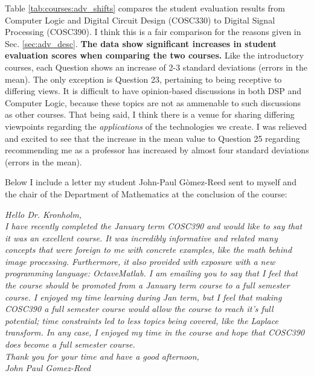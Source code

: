 \documentclass[../../main.tex]{subfiles}
\begin{document}
Table \ref{tab:courses:adv_shifts} compares the student evaluation results from Computer Logic and Digital Circuit Design (COSC330) to Digital Signal Processing (COSC390).  I think this is a fair comparison for the reasons given in Sec. \ref{sec:adv_desc}.  \textbf{The data show significant increases in student evaluation scores when comparing the two courses.}  Like the introductory courses, each Question shows an increase of 2-3 standard deviations (errors in the mean).  The only exception is Question 23, pertaining to being receptive to differing views.  It is difficult to have opinion-based discussions in both DSP and Computer Logic, because these topics are not as ammenable to such discussions as other courses.  That being said, I think there is a venue for sharing differing viewpoints regarding the \textit{applications} of the technologies we create.  I was relieved and excited to see that the increase in the mean value to Question 25 regarding recommending me as a professor has increased by almost four standard deviations (errors in the mean). \\ \hspace{0.1cm}

Below I include a letter my student John-Paul G\`{o}mez-Reed sent to myself and the chair of the Department of Mathematics at the conclusion of the course: \\ \hspace{0.1cm}

\textit{Hello Dr. Kronholm, \\ \vspace{0.5cm} I have recently completed the January term COSC390 and would like to say that it was an excellent course. It was incredibly informative and related many concepts that were foreign to me with concrete examples, like the math behind image processing.  Furthermore, it also provided with exposure with a new programming language: Octave\/Matlab.  I am emailing you to say that I feel that the course should be promoted from a January term course to a full semester course.  I enjoyed my time learning during Jan term, but I feel that making COSC390 a full semester course would allow the course to reach it's full potential; time constraints led to less topics being covered, like the Laplace transform.  In any case, I enjoyed my time in the course and hope that COSC390 does become a full semester course. \\ \vspace{0.5cm} Thank you for your time and have a good afternoon, \\ John Paul Gomez-Reed}
\end{document}
